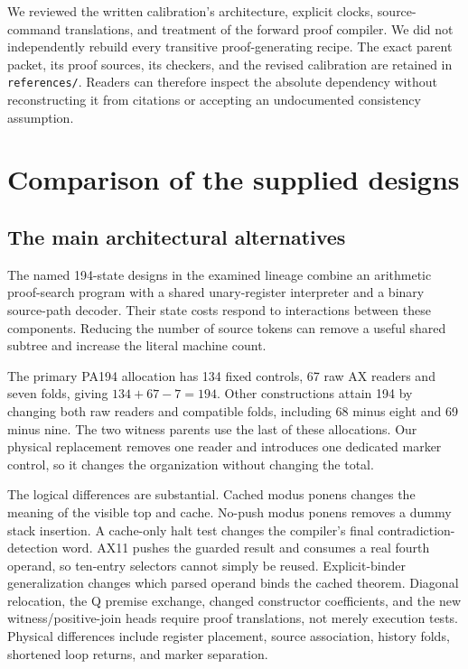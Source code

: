 \documentclass[11pt,letterpaper]{article}
\newcommand{\file}[1]{\texttt{\nolinkurl{#1}}}
\begin{document}
We reviewed the written calibration's architecture, explicit clocks,
source-command translations, and treatment of the forward proof compiler.
We did not independently rebuild every transitive proof-generating recipe.
The exact parent packet, its proof sources, its checkers, and the revised
calibration are retained in \file{references/}. Readers can therefore
inspect the absolute dependency without reconstructing it from citations
or accepting an undocumented consistency assumption.

\section{Comparison of the supplied designs}
\label{sec:comparison}


\subsection{The main architectural alternatives}
The named 194-state designs in the examined lineage combine an arithmetic
proof-search program with a shared unary-register interpreter and a binary
source-path decoder. Their state costs respond to interactions between
these components. Reducing the number of source tokens can remove a useful
shared subtree and increase the literal machine count.

The primary PA194 allocation has 134 fixed controls, 67 raw AX readers and
seven folds, giving $134+67-7=194$. Other constructions attain 194 by
changing both raw readers and compatible folds, including 68 minus eight
and 69 minus nine. The two witness parents use the last of these allocations.
Our physical replacement removes one reader and introduces one dedicated
marker control, so it changes the organization without changing the total.

The logical differences are substantial. Cached modus ponens changes the
meaning of the visible top and cache. No-push modus ponens removes a dummy
stack insertion. A cache-only halt test changes the compiler's final
contradiction-detection word. AX11 pushes the guarded result and consumes
a real fourth operand, so ten-entry selectors cannot simply be reused.
Explicit-binder generalization changes which parsed operand binds the
cached theorem. Diagonal relocation, the Q premise exchange, changed
constructor coefficients, and the new witness/positive-join heads require
proof translations, not merely execution tests. Physical differences
include register placement, source association, history folds, shortened
loop returns, and marker separation.
\end{document}
